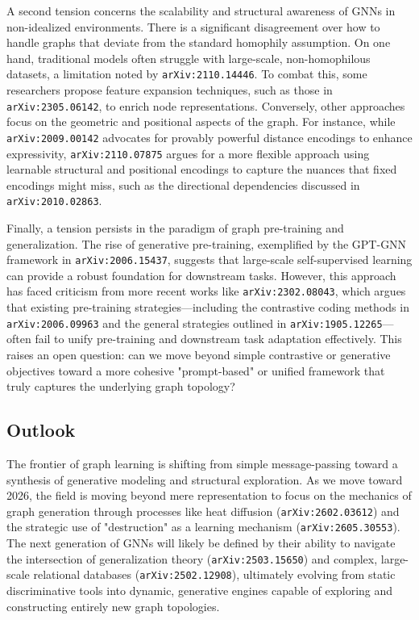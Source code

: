 \documentclass[11pt]{article}
\begin{document}
A second tension concerns the scalability and structural awareness of GNNs in non-idealized environments. There is a significant disagreement over how to handle graphs that deviate from the standard homophily assumption. On one hand, traditional models often struggle with large-scale, non-homophilous datasets, a limitation noted by \texttt{arXiv:2110.14446}. To combat this, some researchers propose feature expansion techniques, such as those in \texttt{arXiv:2305.06142}, to enrich node representations. Conversely, other approaches focus on the geometric and positional aspects of the graph. For instance, while \texttt{arXiv:2009.00142} advocates for provably powerful distance encodings to enhance expressivity, \texttt{arXiv:2110.07875} argues for a more flexible approach using learnable structural and positional encodings to capture the nuances that fixed encodings might miss, such as the directional dependencies discussed in \texttt{arXiv:2010.02863}.

Finally, a tension persists in the paradigm of graph pre-training and generalization. The rise of generative pre-training, exemplified by the GPT-GNN framework in \texttt{arXiv:2006.15437}, suggests that large-scale self-supervised learning can provide a robust foundation for downstream tasks. However, this approach has faced criticism from more recent works like \texttt{arXiv:2302.08043}, which argues that existing pre-training strategies—including the contrastive coding methods in \texttt{arXiv:2006.09963} and the general strategies outlined in \texttt{arXiv:1905.12265}—often fail to unify pre-training and downstream task adaptation effectively. This raises an open question: can we move beyond simple contrastive or generative objectives toward a more cohesive "prompt-based" or unified framework that truly captures the underlying graph topology?

\subsection{Outlook}

The frontier of graph learning is shifting from simple message-passing toward a synthesis of generative modeling and structural exploration. As we move toward 2026, the field is moving beyond mere representation to focus on the mechanics of graph generation through processes like heat diffusion (\texttt{arXiv:2602.03612}) and the strategic use of "destruction" as a learning mechanism (\texttt{arXiv:2605.30553}). The next generation of GNNs will likely be defined by their ability to navigate the intersection of generalization theory (\texttt{arXiv:2503.15650}) and complex, large-scale relational databases (\texttt{arXiv:2502.12908}), ultimately evolving from static discriminative tools into dynamic, generative engines capable of exploring and constructing entirely new graph topologies.
\end{document}
